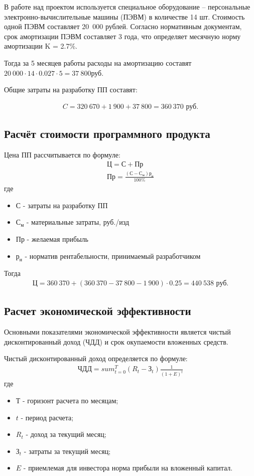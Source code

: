 В работе над проектом используется специальное оборудование –
персональные электронно-вычислительные машины (ПЭВМ) в количестве 14
шт. Стоимость одной ПЭВМ составляет 20~000 рублей. Согласно нормативным документам, срок амортизации ПЭВМ составляет 3 года, что определяет месячную норму амортизации K = 2.7\%.

Тогда за 5 месяцев работы расходы на амортизацию составят $20~000 \cdot 14 \cdot 0.027 \cdot 5 = 37~800 \text{руб.}$

Общие затраты на разработку ПП составят:

\begin{gather*}
  C = 320~670 + 1~900 + 37~800 = 360~370 \text{ руб.}
\end{gather*}

\subsection{Расчёт стоимости программного продукта}
Цена ПП рассчитывается по формуле:
\begin{gather*}
  Ц = С + Пр\\
  Пр = \frac{(С-С_м)р_н}{100 \%}
\end{gather*}
где
\begin{itemize}  
 \item $С$ - затраты на разработку ПП\\
 \item $С_м$ - материальные затраты, руб./изд\\
 \item $Пр$ - желаемая прибыль\\ 
 \item $р_н$ - норматив рентабельности, принимаемый разработчиком\\  
\end{itemize}

Тогда
\begin{gather*}
  Ц = 360~370 + (360~370 - 37~800 - 1~900) \cdot 0.25 = 440~538 \text{ руб.}
\end{gather*}

\subsection{Расчет экономической эффективности}

Основными показателями экономической эффективности является
чистый дисконтированный доход (ЧДД) и срок окупаемости вложенных
средств.

Чистый дисконтированный доход определяется по формуле:
\begin{gather*}
  ЧДД = sum_{t=0}^T (R_t - З_t) \frac{1}{(1 + E)^t}
\end{gather*}
где
\begin{itemize}
  \item $Т$ - горизонт расчета по месяцам;
  \item $t$ - период расчета;
  \item $R_t$ - доход за текущий месяц;
  \item $З_t$ - затраты за текущий месяц;
  \item $E$ - приемлемая для инвестора норма прибыли на вложенный капитал.
\end{itemize}

